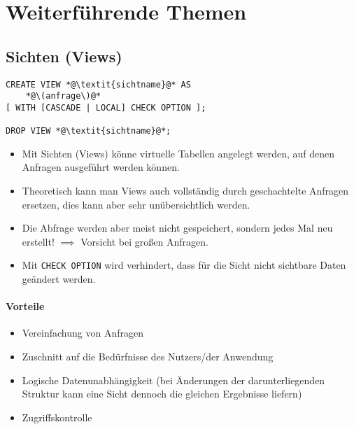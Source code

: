     \section{Weiterführende Themen} %
        \subsection{Sichten (Views)} %
        	\begin{lstlisting}
CREATE VIEW *@\textit{sichtname}@* AS
	*@\(anfrage\)@*
[ WITH [CASCADE | LOCAL] CHECK OPTION ];

DROP VIEW *@\textit{sichtname}@*;
        	\end{lstlisting}
        	
        	\begin{itemize}
        		\item Mit Sichten (Views) könne virtuelle Tabellen angelegt werden, auf denen Anfragen ausgeführt werden können.
        		\item Theoretisch kann man Views auch vollständig durch geschachtelte Anfragen ersetzen, dies kann aber sehr unübersichtlich werden.
        		\item Die Abfrage werden aber meist nicht gespeichert, sondern jedes Mal neu erstellt! \(\implies\) Vorsicht bei großen Anfragen.
        		\item Mit \lstinline|CHECK OPTION| wird verhindert, dass für die Sicht nicht sichtbare Daten geändert werden.
        	\end{itemize}
        
        	\paragraph{Vorteile}
        		\begin{itemize}
        			\item Vereinfachung von Anfragen
        			\item Zuschnitt auf die Bedürfnisse des Nutzers/der Anwendung
        			\item Logische Datenunabhängigkeit (bei Änderungen der darunterliegenden Struktur kann eine Sicht dennoch die gleichen Ergebnisse liefern)
        			\item Zugriffskontrolle
        		\end{itemize}
        	
